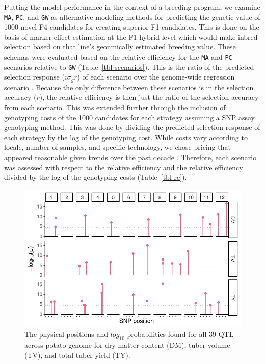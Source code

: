 Putting the model performance in the context of a breeding program, we
examine \texttt{MA}, \texttt{PC}, and \texttt{GW} as alternative
modeling methods for predicting the genetic value of 1000 novel F4
candidates for creating superior F1 candidates. This is done on the basis of marker effect estimation at the F1 hybrid level which would make inbred selection based on that line's geonmically estimated breeding value. These schemas were evaluated
based on the relative efficiency for the \texttt{MA} and \texttt{PC}
scenarios relative to \texttt{GW} (Table~\ref{tbl-scenarios}). This is
the ratio of the predicted selection response (\(i\sigma_gr\)) of each
scenario over the genome-wide regression scenario \autocite{Krchov2015}.
Because the only difference between these scenarios is in the selection
accuracy (\(r\)), the relative efficiency is then just the ratio of the
selection accuracy from each scenario. This was extended further through
the inclusion of genotyping costs of the 1000 candidates for each
strategy assuming a SNP assay genotyping method. This was done by
dividing the predicted selection response of each strategy by the log of
the genotyping cost. While costs vary according to locale, number of
samples, and specific technology, we chose pricing that appeared
reasonable given trends over the past decade \autocite{Semagn2014}.
Therefore, each scenario was assessed with respect to the relative
efficiency and the relative efficiency divided by the log of the
genotyping costs (Table~\ref{tbl-re}).

\begin{figure}

{\centering \includegraphics{figs_04/fig-lod-score-1.pdf}

}

\caption{\label{fig-lod-score}The physical positions and \(log_{10}\)
probabilities found for all 39 QTL across potato genome for dry matter
content (DM), tuber volume (TV), and total tuber yield (TY).}

\end{figure}
